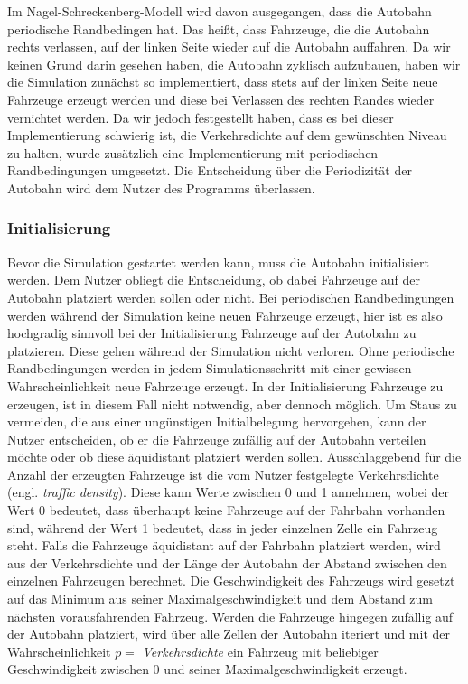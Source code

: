 \documentclass[11pt, a4paper]{article}
\newcommand\nsm{Nagel-Schreckenberg-Modell }
\begin{document}
Im \nsm wird davon ausgegangen, dass die Autobahn periodische Randbedingen hat. Das heißt, dass Fahrzeuge, die die Autobahn rechts verlassen, auf der linken Seite wieder auf die Autobahn auffahren. Da wir keinen Grund darin gesehen haben, die Autobahn zyklisch aufzubauen, haben wir die Simulation zunächst so implementiert, dass stets auf der linken Seite neue Fahrzeuge erzeugt werden und diese bei Verlassen des rechten Randes wieder vernichtet werden. Da wir jedoch festgestellt haben, dass es bei dieser Implementierung schwierig ist, die Verkehrsdichte auf dem gewünschten Niveau zu halten, wurde zusätzlich eine Implementierung mit periodischen Randbedingungen umgesetzt. Die Entscheidung über die Periodizität der Autobahn wird dem Nutzer des Programms überlassen.

\subsubsection{Initialisierung}
\label{subsubsec:initialisierung}

Bevor die Simulation gestartet werden kann, muss die Autobahn initialisiert werden. Dem Nutzer obliegt die Entscheidung, ob dabei Fahrzeuge auf der Autobahn platziert werden sollen oder nicht. Bei periodischen Randbedingungen werden während der Simulation keine neuen Fahrzeuge erzeugt, hier ist es also hochgradig sinnvoll bei der Initialisierung Fahrzeuge auf der Autobahn zu platzieren. Diese gehen während der Simulation nicht verloren. Ohne periodische Randbedingungen werden in jedem Simulationsschritt mit einer gewissen Wahrscheinlichkeit neue Fahrzeuge erzeugt. In der Initialisierung Fahrzeuge zu erzeugen, ist in diesem Fall nicht notwendig, aber dennoch möglich.
Um Staus zu vermeiden, die aus einer ungünstigen Initialbelegung hervorgehen, kann der Nutzer entscheiden, ob er die Fahrzeuge zufällig auf der Autobahn verteilen möchte oder ob diese äquidistant platziert werden sollen. Ausschlaggebend für die Anzahl der erzeugten Fahrzeuge ist die vom Nutzer festgelegte Verkehrsdichte (engl. \emph{traffic density}). Diese kann Werte zwischen 0 und 1 annehmen, wobei der Wert 0 bedeutet, dass überhaupt keine Fahrzeuge auf der Fahrbahn vorhanden sind, während der Wert 1 bedeutet, dass in jeder einzelnen Zelle ein Fahrzeug steht. Falls die Fahrzeuge äquidistant auf der Fahrbahn platziert werden, wird aus der Verkehrsdichte und der Länge der Autobahn der Abstand zwischen den einzelnen Fahrzeugen berechnet. Die Geschwindigkeit des Fahrzeugs wird gesetzt auf das Minimum aus seiner Maximalgeschwindigkeit und dem Abstand zum nächsten vorausfahrenden Fahrzeug. Werden die Fahrzeuge hingegen zufällig auf der Autobahn platziert, wird über alle Zellen der Autobahn iteriert und mit der Wahrscheinlichkeit $p =$ \emph{Verkehrsdichte} ein Fahrzeug mit beliebiger Geschwindigkeit zwischen 0 und seiner Maximalgeschwindigkeit erzeugt.
\end{document}
